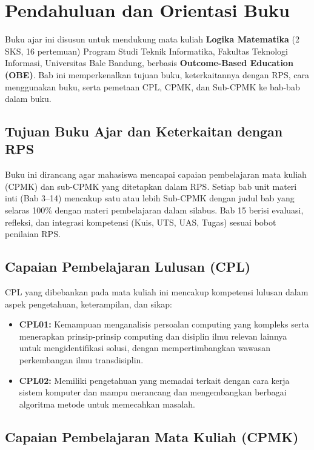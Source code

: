 \documentclass[../main]{subfiles}
\begin{document}
\chapter{Pendahuluan dan Orientasi Buku}

Buku ajar ini disusun untuk mendukung mata kuliah \textbf{Logika Matematika} (2 SKS, 16 pertemuan) Program Studi Teknik Informatika, Fakultas Teknologi Informasi, Universitas Bale Bandung, berbasis \textbf{Outcome-Based Education (OBE)}. Bab ini memperkenalkan tujuan buku, keterkaitannya dengan RPS, cara menggunakan buku, serta pemetaan CPL, CPMK, dan Sub-CPMK ke bab-bab dalam buku.

\section*{Tujuan Buku Ajar dan Keterkaitan dengan RPS}

Buku ini dirancang agar mahasiswa mencapai capaian pembelajaran mata kuliah (CPMK) dan sub-CPMK yang ditetapkan dalam RPS. Setiap bab unit materi inti (Bab 3--14) mencakup satu atau lebih Sub-CPMK dengan judul bab yang selaras 100\% dengan materi pembelajaran dalam silabus. Bab 15 berisi evaluasi, refleksi, dan integrasi kompetensi (Kuis, UTS, UAS, Tugas) sesuai bobot penilaian RPS.

\section*{Capaian Pembelajaran Lulusan (CPL)}

CPL yang dibebankan pada mata kuliah ini mencakup kompetensi lulusan dalam aspek pengetahuan, keterampilan, dan sikap:

\begin{itemize}[leftmargin=*]
  \item \textbf{CPL01:} Kemampuan menganalisis persoalan computing yang kompleks serta menerapkan prinsip-prinsip computing dan disiplin ilmu relevan lainnya untuk mengidentifikasi solusi, dengan mempertimbangkan wawasan perkembangan ilmu transdisiplin.
  \item \textbf{CPL02:} Memiliki pengetahuan yang memadai terkait dengan cara kerja sistem komputer dan mampu merancang dan mengembangkan berbagai algoritma metode untuk memecahkan masalah.
\end{itemize}

\section*{Capaian Pembelajaran Mata Kuliah (CPMK)}
\end{document}
